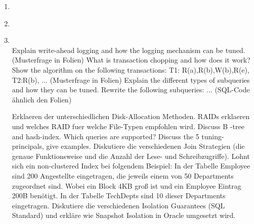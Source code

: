 \documentclass[12pt]{article}\pagestyle{myheadings}
\theoremstyle{plain}
\begin{document}
\begin{enumerate}
\begin{itemize}
\end{itemize}
\item \textbf{} \\
\item \textbf{} \\
\item \textbf{} \\
Explain write-ahead logging and how the logging mechanism can be tuned. (Musterfrage in Folien)
What is transaction chopping and how does it work? Show the algorithm on the following transactions: T1:
R(a),R(b),W(b),R(e), T2:R(b), ... (Musterfrage in Folien)
Explain the different types of subqueries and how they can be tuned. Rewrite the following subqueries: ...
(SQL-Code ähnlich den Folien)

Erklaeren der unterschiedlichen Disk-Allocation Methoden. RAIDs erklaeren und welches RAID fuer welche
File-Typen empfohlen wird.
Discuss B -tree and hash-index. Which queries are supported?
Discuss the 5 tuning-principals, give examples.
Diskutiere die verschiedenen Join Strategien (die genaue Funktionsweise und die Anzahl der Lese- und
Schreibzugriffe). Lohnt sich ein non-clustered Index bei folgendem Beispiel: In der Tabelle Employee sind 200
Angestellte eingetragen, die jeweils einem von 50 Departments zugeordnet sind. Wobei ein Block 4KB groß ist
und ein Employee Eintrag 200B benötigt. In der Tabelle TechDepts sind 10 dieser Departments eingetragen.
Diskutiere die verschiedenen Isolation Guarantees (SQL Standard) und erkläre wie Snapshot Isolation in
Oracle umgesetzt wird.




\end{enumerate}
\end{document}

